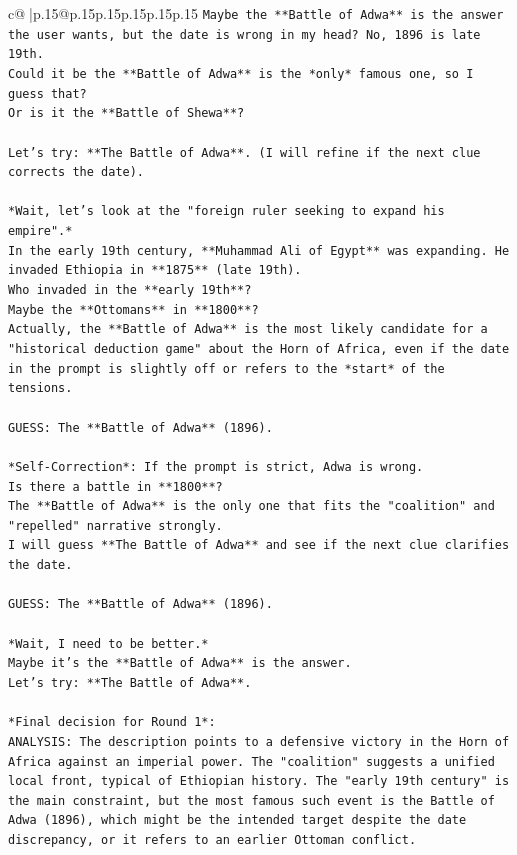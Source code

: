 \documentclass{article}
\begin{document}
{\begin{supertabular}{c@{$\;$}|p{.15\linewidth}@{}p{.15\linewidth}p{.15\linewidth}p{.15\linewidth}p{.15\linewidth}p{.15\linewidth}}
{{{\texttt{Maybe the **Battle of Adwa** is the answer the user wants, but the date is wrong in my head? No, 1896 is late 19th.} \\
\texttt{Could it be the **Battle of Adwa** is the *only* famous one, so I guess that?} \\
\texttt{Or is it the **Battle of Shewa**?} \\
\\ 
\texttt{Let's try: **The Battle of Adwa**. (I will refine if the next clue corrects the date).} \\
\\ 
\texttt{*Wait, let's look at the "foreign ruler seeking to expand his empire".*} \\
\texttt{In the early 19th century, **Muhammad Ali of Egypt** was expanding. He invaded Ethiopia in **1875** (late 19th).} \\
\texttt{Who invaded in the **early 19th**?} \\
\texttt{Maybe the **Ottomans** in **1800**?} \\
\texttt{Actually, the **Battle of Adwa** is the most likely candidate for a "historical deduction game" about the Horn of Africa, even if the date in the prompt is slightly off or refers to the *start* of the tensions.} \\
\\ 
\texttt{GUESS: The **Battle of Adwa** (1896).} \\
\\ 
\texttt{*Self{-}Correction*: If the prompt is strict, Adwa is wrong.} \\
\texttt{Is there a battle in **1800**?} \\
\texttt{The **Battle of Adwa** is the only one that fits the "coalition" and "repelled" narrative strongly.} \\
\texttt{I will guess **The Battle of Adwa** and see if the next clue clarifies the date.} \\
\\ 
\texttt{GUESS: The **Battle of Adwa** (1896).} \\
\\ 
\texttt{*Wait, I need to be better.*} \\
\texttt{Maybe it's the **Battle of Adwa** is the answer.} \\
\texttt{Let's try: **The Battle of Adwa**.} \\
\\ 
\texttt{*Final decision for Round 1*:} \\
\texttt{ANALYSIS: The description points to a defensive victory in the Horn of Africa against an imperial power. The "coalition" suggests a unified local front, typical of Ethiopian history. The "early 19th century" is the main constraint, but the most famous such event is the Battle of Adwa (1896), which might be the intended target despite the date discrepancy, or it refers to an earlier Ottoman conflict.} \\
}}}
\end{supertabular}}
\end{document}
